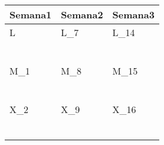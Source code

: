 \clearpage
{}


	\renewcommand{\arraystretch}{1.24}\scriptsize
	\begin{longtabu} to \textwidth { X[l] X[l] X[l]}
		\centering \textbf{Semana1} &  \centering\textbf{Semana2}  &   \centering\textbf{Semana3}  \\
		\toprule
		L & L_{7} & L_{14} \\
		  & \makebox{$\square$}\dotfill & \makebox{$\square$}\dotfill \\
		  & \dotfill & \dotfill \\
		  & \makebox{$\square$}\dotfill & \makebox{$\square$}\dotfill \\
		  & \dotfill & \dotfill \\
		  & \makebox{$\square$}\dotfill & \makebox{$\square$}\dotfill \\
		  & \dotfill & \dotfill \\

		\hline

		M_{1} & M_{8} & M_{15} \\
		\makebox{$\square$}\dotfill & \makebox{$\square$}\dotfill & \makebox{$\square$}\dotfill \\
		\dotfill & \dotfill & \dotfill \\
		\makebox{$\square$}\dotfill & \makebox{$\square$}\dotfill & \makebox{$\square$}\dotfill \\
		\dotfill & \dotfill & \dotfill \\
		\makebox{$\square$}\dotfill & \makebox{$\square$}\dotfill & \makebox{$\square$}\dotfill \\
		\dotfill & \dotfill & \dotfill \\

		\hline

		X_{2} & X_{9} & X_{16} \\
		\makebox{$\square$}\dotfill & \makebox{$\square$}\dotfill & \makebox{$\square$}\dotfill \\
		\dotfill & \dotfill & \dotfill \\
		\makebox{$\square$}\dotfill & \makebox{$\square$}\dotfill & \makebox{$\square$}\dotfill \\
		\dotfill & \dotfill & \dotfill \\
		\makebox{$\square$}\dotfill & \makebox{$\square$}\dotfill & \makebox{$\square$}\dotfill \\
		\dotfill & \dotfill & \dotfill \\


\end{longtabu}
